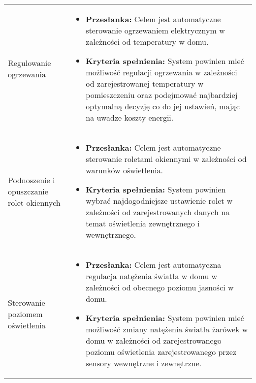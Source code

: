 \documentclass{article}
\begin{document}
\begin{center}
{\begin{longtable}{p{5cm}p{10cm}}
	Regulowanie ogrzewania&
	\begin{itemize}
	\item \textbf{Przesłanka:} Celem jest automatyczne sterowanie ogrzewaniem elektrycznym w zależności od temperatury w domu.
	\item \textbf{Kryteria spełnienia:} System powinien mieć możliwość regulacji ogrzewania w zależności od zarejestrowanej temperatury w pomieszczeniu oraz podejmować najbardziej optymalną decyzję co do jej ustawień, mając na uwadze koszty energii.
	\end{itemize}\\
	
	Podnoszenie i opuszczanie rolet okiennych&
	\begin{itemize}
	\item \textbf{Przesłanka:} Celem jest automatyczne sterowanie roletami okiennymi w zależności od warunków oświetlenia.
	\item \textbf{Kryteria spełnienia:} System powinien wybrać najdogodniejsze ustawienie rolet w zależności od zarejestrowanych danych na temat oświetlenia zewnętrznego i wewnętrznego.
	\end{itemize}\\

	Sterowanie poziomem oświetlenia&
	\begin{itemize}
	\item \textbf{Przesłanka:} Celem jest automatyczna regulacja natężenia światła w domu w zależności od obecnego poziomu jasności w domu.
	\item \textbf{Kryteria spełnienia:} System powinien mieć możliwość zmiany natężenia światła żarówek w domu w zależności od zarejestrowanego poziomu oświetlenia zarejestrowanego przez sensory wewnętrzne i zewnętrzne.
	\end{itemize}\\

\end{longtable}}
\end{center}
\end{document}
